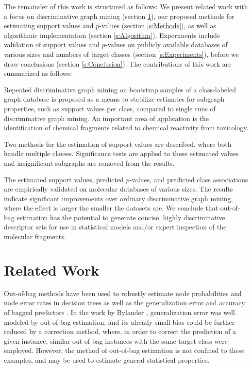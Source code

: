 \documentclass{article}
\begin{document}
The remainder of this work is structured as follows: We present related work
with a focus on discriminative graph mining (section \ref{s:relatedWork}),
our proposed methods for estimating support values and $p$-values (section
\ref{s:Methods}), as well as algorithmic implementation
(section \ref{s:Algorithm}). Experiments include validation of support
values and $p$-values on publicly available databases of
various sizes and numbers of target classes (section \ref{s:Experiments}),
before we draw conclusions (section \ref{s:Conclusion}).
The contributions of this work are summarized as follows:
\begin{itemize*}
  \item Repeated discriminative graph mining on bootstrap samples of a
    class-labeled graph database is proposed as a means to stabilize estimates
    for subgraph properties, such as support values per class, compared to
    single runs of discriminative graph mining. An important area of
    application is the identification of chemical fragments related to chemical
    reactivity from toxicology.
  \item Two methods for the estimation of support values are described, where both
    handle multiple classes. Significance tests are applied to these
    estimated values and insignificant subgraphs are removed from the results.  
  \item The estimated support values, predicted $p$-values, and predicted class
    associations are empirically validated on molecular databases of various
    sizes.  The results indicate significant improvements over 
    ordinary discriminative graph mining, where the effect is larger the
    smaller the datasets are.  We conclude that out-of-bag estimation has the
    potential to generate concise, highly discriminative descriptor sets for
    use in statistical models and/or expert inspection of the molecular
    fragments.
\end{itemize*}


\section{Related Work}
\label{s:relatedWork}

Out-of-bag methods have been used to robustly estimate node probabilities and
node error rates in decision trees \cite{breiman96oob} as well as the
generalization error and accuracy of bagged predictors
\cite{bylander02estimating}. In the work by Bylander
\cite{bylander02estimating}, generalization error was well modeled by
out-of-bag estimation, and its already small bias could be further reduced by a
correction method, where, in order to correct the prediction of a given
instance, similar out-of-bag instances with the same target class were
employed. However, the method of out-of-bag estimation is not confined to these
examples, and may be used to estimate general statistical properties.
\end{document}
